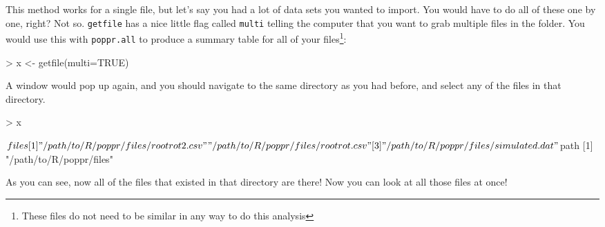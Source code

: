 \documentclass[letterpaper]{article}
\begin{document}
This method works for a single file, but let's say you had a lot of data sets you wanted to import. You would have to do all of these one by one, right? Not so. \texttt{getfile} has a nice little flag called \texttt{multi} telling the computer that you want to grab multiple files in the folder. You would use this with \texttt{poppr.all} to produce a summary table for all of your files\footnote{These files do not need to be similar in any way to do this analysis}:
\begin{Schunk}
\begin{Sinput}
> x <- getfile(multi=TRUE)
\end{Sinput}
\end{Schunk}
A window would pop up again, and you should navigate to the same directory as you had before, and select any of the files in that directory. 
\begin{Schunk}
\begin{Sinput}
> x
\end{Sinput}
\end{Schunk}
\begin{Schunk}
\begin{Soutput}
$files
[1] "/path/to/R/poppr/files/rootrot2.csv"  "/path/to/R/poppr/files/rootrot.csv"  
[3] "/path/to/R/poppr/files/simulated.dat"

$path
[1] "/path/to/R/poppr/files"
\end{Soutput}
\end{Schunk}
As you can see, now all of the files that existed in that directory are there! Now you can look at all those files at once!
\begin{Schunk}
\end{Schunk}
\end{document}
